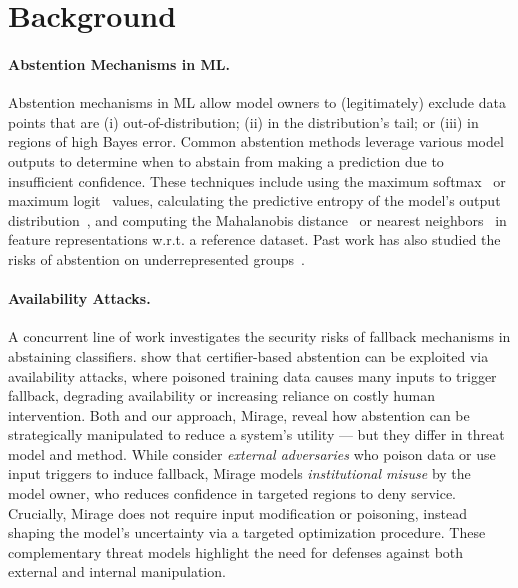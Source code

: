 \section{Background}

\paragraph{Abstention Mechanisms in ML.}
Abstention mechanisms in ML allow model owners to (legitimately) exclude data points that are (i) out-of-distribution; (ii) in the distribution's tail; or (iii) in regions of high Bayes error. Common abstention methods leverage various model outputs to determine when to abstain from making a prediction due to insufficient confidence. These techniques include using the maximum softmax~\citep{hendrycks2016baseline} or maximum logit~\citep{hendrycks2019scaling} values, calculating the predictive entropy of the model's output distribution~\citep{lakshminarayanan2017simple}, and computing the Mahalanobis distance~\citep{lee2018simple, ren2021simple} or nearest neighbors~\citep{raghuram2021general, dziedzic2022p, sun2022out} in feature representations w.r.t. a reference dataset. Past work has also studied the risks of abstention on underrepresented groups~\citep{jones2020selective}.

\paragraph{Availability Attacks.} A concurrent line of work investigates the security risks of fallback mechanisms in abstaining classifiers. \citet{lorenz2023certifiers} show that certifier-based abstention can be exploited via availability attacks, where poisoned training data causes many inputs to trigger fallback, degrading availability or increasing reliance on costly human intervention. Both \citet{lorenz2023certifiers} and our approach, Mirage, reveal how abstention can be strategically manipulated to reduce a system’s utility --- but they differ in threat model and method. While \citet{lorenz2023certifiers} consider \emph{external adversaries} who poison data or use input triggers to induce fallback, Mirage models \emph{institutional misuse} by the model owner, who reduces confidence in targeted regions to deny service. Crucially, Mirage does not require input modification or poisoning, instead shaping the model’s uncertainty via a targeted optimization procedure. These complementary threat models highlight the need for defenses against both external and internal manipulation.

